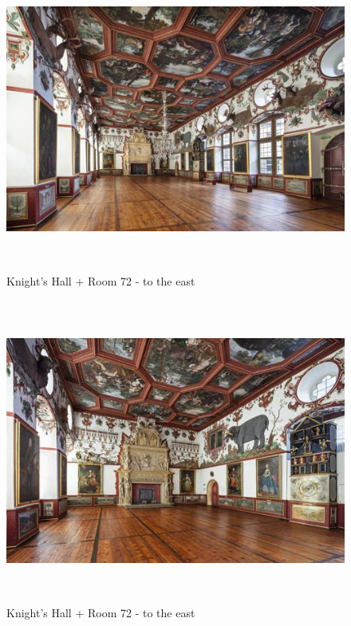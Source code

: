 \documentclass[
  a4paper,
  openany]{book}
\begin{document}
\begin{figure}[H]
\centering
\includegraphics[height=10cm]{./images/fmd10005859a.jpg}
\caption{Knight's Hall + Room 72 - to the east}
\label{fig:{https://previous.bildindex.de/bilder/fmd10005859a.jpg}}
\end{figure}

\clearpage

\begin{figure}[H]
\centering
\includegraphics[height=10cm]{./images/fmd10005860a.jpg}
\caption{Knight's Hall + Room 72 - to the east}
\label{fig:{https://previous.bildindex.de/bilder/fmd10005860a.jpg}}
\end{figure}

\clearpage
\end{document}
